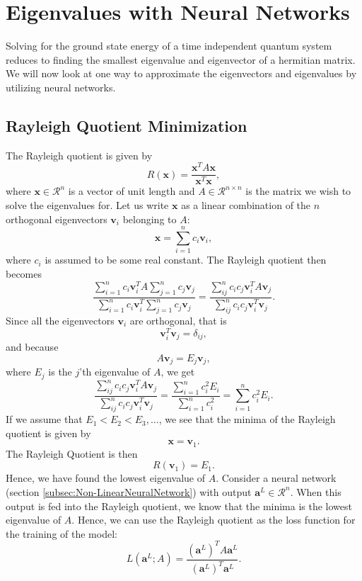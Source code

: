 \section{Eigenvalues with Neural Networks}
\label{sec:QuantumEigenvalsNeurNet}

Solving for the ground state energy of a time independent quantum system reduces to finding the smallest eigenvalue and eigenvector of a hermitian matrix. We will now look at one way to approximate the eigenvectors and eigenvalues by utilizing neural networks.

\subsection{Rayleigh Quotient Minimization \cite{RayleighQuotient}}
\label{subsec:RayleighQMinimization}
The Rayleigh quotient is given by
\begin{equation}
    \label{eq:RayleighQuotient}
    R(\boldsymbol{x}) = \frac{\boldsymbol{x}^TA\boldsymbol{x}}{\boldsymbol{x}^T\boldsymbol{x}},
\end{equation}
where $\boldsymbol{x} \in \mathcal{R}^n$ is a vector of unit length and $A \in \mathcal{R}^{n\times n}$ is the matrix we wish to solve the eigenvalues for. Let us write $\boldsymbol{x}$ as a linear combination of the $n$ orthogonal eigenvectors $\boldsymbol{v}_i$ belonging to $A$:
$$\boldsymbol{x} = \sum_{i=1}^n c_i \boldsymbol{v}_i,  $$
where $c_i$ is assumed to be some real constant.
The Rayleigh quotient then becomes
$$\frac{\sum_{i=1}^n c_i \boldsymbol{v}_i^TA \sum_{j=1}^n c_j \boldsymbol{v}_j}{\sum_{i=1}^n c_i \boldsymbol{v}_i^T\sum_{j=1}^n c_j \boldsymbol{v}_j} = \frac{\sum_{ij}^nc_ic_j \boldsymbol{v}_i^T A \boldsymbol{v}_j}{\sum_{ij}^n c_i c_j \boldsymbol{v}_i^T \boldsymbol{v}_j}. $$
Since all the eigenvectors $\boldsymbol{v}_i$ are orthogonal, that is
$$ \boldsymbol{v}_i^T \boldsymbol{v}_j = \delta_{ij},$$
and because
$$A\boldsymbol{v}_j = E_j \boldsymbol{v}_j,$$
where $E_j$ is the $j$'th eigenvalue of $A$, we get
$$\frac{\sum_{ij}^nc_ic_j \boldsymbol{v}_i^T A \boldsymbol{v}_j}{\sum_{ij}^n c_i c_j \boldsymbol{v}_i^T \boldsymbol{v}_j} = \frac{\sum_{i=1}^n c_i^2E_i}{\sum_{i=1}^n c_i^2 } = \sum_{i=1}^n c_i^2 E_i.$$
If we assume that $E_1 < E_2 < E_3, \dots$, we see that the minima of the Rayleigh quotient is given by 
$$\boldsymbol{x} = \boldsymbol{v}_1.$$
The Rayleigh Quotient is then
$$R(\boldsymbol{v}_1) = E_1.$$
Hence, we have found the lowest eigenvalue of $A$.
Consider a neural network (section \ref{subsec:Non-LinearNeuralNetwork}) with output $\boldsymbol{a}^L \in \mathcal{R}^n$. When this output is fed into the Rayleigh quotient, we know that the minima is the lowest eigenvalue of $A$. Hence, we can use the Rayleigh quotient as the loss function for the training of the model:
\begin{equation}
    \label{eq:RayleighLossFunction}
    L(\boldsymbol{a}^L;A) = \frac{(\boldsymbol{a}^L)^T A \boldsymbol{a}^L}{(\boldsymbol{a}^L)^T \boldsymbol{a}^L}.
\end{equation}